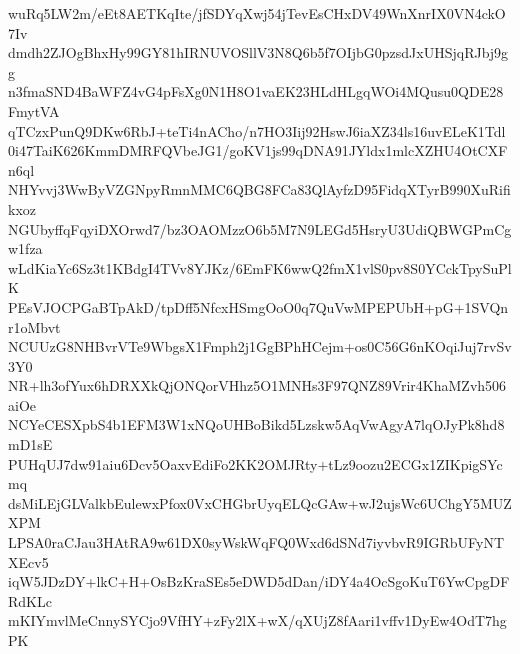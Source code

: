 wuRq5LW2m/eEt8AETKqIte/jfSDYqXwj54jTevEsCHxDV49WnXnrIX0VN4ckO7Iv
dmdh2ZJOgBhxHy99GY81hIRNUVOSllV3N8Q6b5f7OIjbG0pzsdJxUHSjqRJbj9gg
n3fmaSND4BaWFZ4vG4pFsXg0N1H8O1vaEK23HLdHLgqWOi4MQusu0QDE28FmytVA
qTCzxPunQ9DKw6RbJ+teTi4nACho/n7HO3Iij92HswJ6iaXZ34ls16uvELeK1Tdl
0i47TaiK626KmmDMRFQVbeJG1/goKV1js99qDNA91JYldx1mlcXZHU4OtCXFn6ql
NHYvvj3WwByVZGNpyRmnMMC6QBG8FCa83QlAyfzD95FidqXTyrB990XuRifikxoz
NGUbyffqFqyiDXOrwd7/bz3OAOMzzO6b5M7N9LEGd5HsryU3UdiQBWGPmCgw1fza
wLdKiaYc6Sz3t1KBdgI4TVv8YJKz/6EmFK6wwQ2fmX1vlS0pv8S0YCckTpySuPlK
PEsVJOCPGaBTpAkD/tpDff5NfcxHSmgOoO0q7QuVwMPEPUbH+pG+1SVQnr1oMbvt
NCUUzG8NHBvrVTe9WbgsX1Fmph2j1GgBPhHCejm+os0C56G6nKOqiJuj7rvSv3Y0
NR+lh3ofYux6hDRXXkQjONQorVHhz5O1MNHs3F97QNZ89Vrir4KhaMZvh506aiOe
NCYeCESXpbS4b1EFM3W1xNQoUHBoBikd5Lzskw5AqVwAgyA7lqOJyPk8hd8mD1sE
PUHqUJ7dw91aiu6Dcv5OaxvEdiFo2KK2OMJRty+tLz9oozu2ECGx1ZIKpigSYcmq
dsMiLEjGLValkbEulewxPfox0VxCHGbrUyqELQcGAw+wJ2ujsWc6UChgY5MUZXPM
LPSA0raCJau3HAtRA9w61DX0syWskWqFQ0Wxd6dSNd7iyvbvR9IGRbUFyNTXEcv5
iqW5JDzDY+lkC+H+OsBzKraSEs5eDWD5dDan/iDY4a4OcSgoKuT6YwCpgDFRdKLc
mKIYmvlMeCnnySYCjo9VfHY+zFy2lX+wX/qXUjZ8fAari1vffv1DyEw4OdT7hgPK
